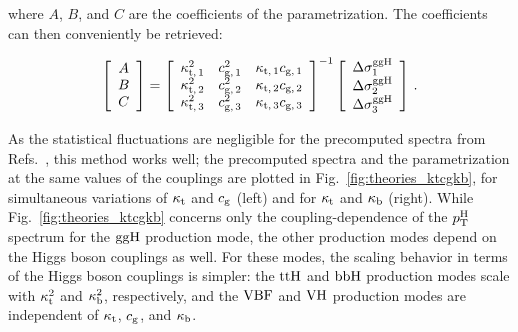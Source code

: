 % 
where $A$, $B$, and $C$ are the coefficients of the parametrization.
% 
The coefficients can then conveniently be retrieved:
% 
\begin{linenomath*}
\begin{equation}
\left[\begin{array}{c}
A \\
B \\
C
\end{array}\right]
=
    \left[\begin{array}{ccc}
        \kappa_{\mathrm{t},\,1}^2  &  c_{\mathrm{g},\,1}^2   &  \kappa_{\mathrm{t},\,1} c_{\mathrm{g},\,1} \\
        \kappa_{\mathrm{t},\,2}^2  &  c_{\mathrm{g},\,2}^2   &  \kappa_{\mathrm{t},\,2} c_{\mathrm{g},\,2} \\
        \kappa_{\mathrm{t},\,3}^2  &  c_{\mathrm{g},\,3}^2   &  \kappa_{\mathrm{t},\,3} c_{\mathrm{g},\,3}
        \end{array}\right]^{-1}
    \left[\begin{array}{c}
        \Delta\sigma_1^{\mathrm{g}\mathrm{g}\mathrm{H}} \\
        \Delta\sigma_2^{\mathrm{g}\mathrm{g}\mathrm{H}} \\
        \Delta\sigma_3^{\mathrm{g}\mathrm{g}\mathrm{H}}
        \end{array}\right]
    \,.
\end{equation}
\end{linenomath*}
% 
As the statistical fluctuations are negligible for the precomputed spectra from Refs.~\cite{Grazzini:2017szg,Grazzini:2016paz}, this method works well; the precomputed spectra and the parametrization at the same values of the couplings are plotted in Fig.~\ref{fig:theories_ktcgkb}, for simultaneous variations of $\kappa_{\mathrm{t}}$ and $c_\mathrm{g}$ (left) and for $\kappa_{\mathrm{t}}$ and $\kappa_{\mathrm{b}}$ (right).
% 
While Fig.~\ref{fig:theories_ktcgkb} concerns only the coupling-dependence of the $p_\mathrm{T}^\mathrm{H}$ spectrum for the $\mathrm{g}\mathrm{g}\mathrm{H}$ production mode, the other production modes depend on the Higgs boson couplings as well.
% 
For these modes, the scaling behavior in terms of the Higgs boson couplings is simpler: the $\mathrm{t}\mathrm{t}\mathrm{H}$ and $\mathrm{b}\mathrm{b}\mathrm{H}$ production modes scale with $\kappa_{\mathrm{t}}^2$ and $\kappa_{\mathrm{b}}^2$, respectively, and the $\text{VBF}$ and $\mathrm{V}\mathrm{H}$ production modes are independent of $\kappa_{\mathrm{t}}$, $c_\mathrm{g}$, and $\kappa_{\mathrm{b}}$.


